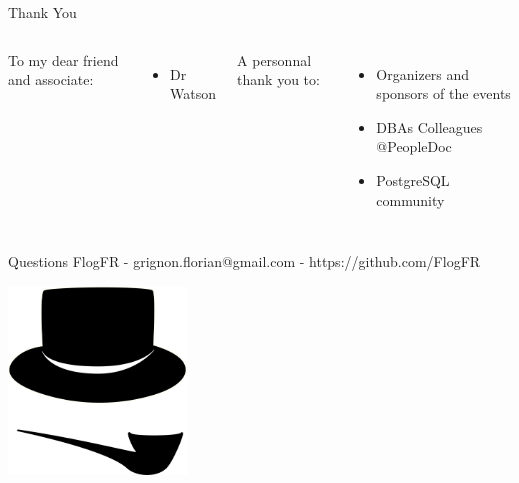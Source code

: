 \documentclass[10pt]{beamer}
\begin{document}
\begin{frame}{Thank You}

  \begin{columns}[T,onlytextwidth]
    To my dear friend and associate:
      \begin{itemize}
        \item Dr Watson
      \end{itemize}
    A personnal thank you to:
      \begin{itemize}
        \item Organizers and sponsors of the events
        \item DBAs Colleagues @PeopleDoc
        \item PostgreSQL community
      \end{itemize}
  \end{columns}

\end{frame}

\appendix

\begin{frame}[fragile]{Questions}
  FlogFR - grignon.florian@gmail.com - https://github.com/FlogFR
  \begin{center}
  \includegraphics[height=5cm]{Chapeau-Pipe.png}
  \end{center}
\end{frame}
\end{document}
